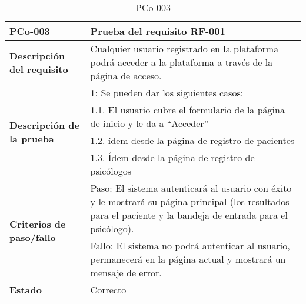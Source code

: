 \begin{table}[htpb]
\centering
\begin{tabularx}{\textwidth}{|l|X|}
\hline
\textbf{PCo-003}                                     & \textbf{Prueba del requisito RF-001}                                                                                                                            \\ \hline
\textbf{Descripción del requisito}                 & Cualquier usuario registrado en la plataforma podrá acceder a la plataforma a través de la página de acceso.                                                    \\ \hline
\multirow{4}{*}{\textbf{Descripción de la prueba}} & 1: Se pueden dar los siguientes casos:                                                                                                                          \\ \cline{2-2} 
                                                   & 1.1. El usuario cubre el formulario de la página de inicio y le da a ``Acceder''
\\ \cline{2-2} 
                                                   & 1.2. ídem desde la página de registro de pacientes                                                                                                              \\ \cline{2-2} 
                                                   & 1.3. Ídem desde la página de registro de psicólogos                                                                                                             \\ \hline
\multirow{2}{*}{\textbf{Criterios de paso/fallo}}  & Paso: El sistema autenticará al usuario con éxito y le mostrará su página principal (los resultados para el paciente y la bandeja de entrada para el psicólogo). \\ \cline{2-2} 
                                                   & Fallo: El sistema no podrá autenticar al usuario, permanecerá en la página actual y mostrará un mensaje de error.                                               \\ \hline
\textbf{Estado}                                    & Correcto                                                                                                                                                        \\ \hline
\end{tabularx}
\caption{PCo-003}
\end{table}


